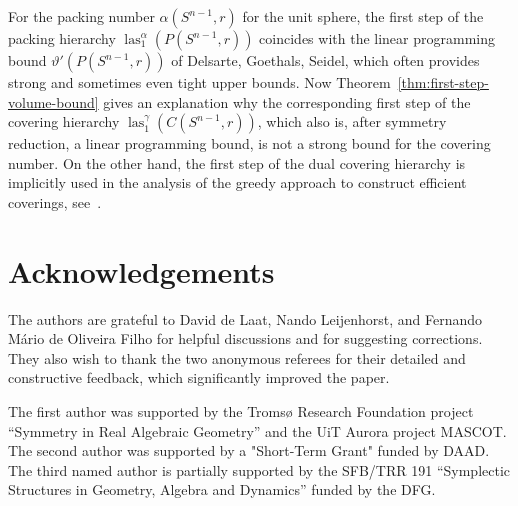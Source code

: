 \documentclass{amsart}
\DeclareMathOperator{\las}{las}
\begin{document}
For the packing number $\alpha(S^{n-1}, r)$ for the unit sphere, the
first step of the packing hierarchy $\las^{\alpha}_1(P(S^{n-1}, r))$
coincides with the linear programming bound $\vartheta'(P(S^{n-1},r))$
of Delsarte, Goethals, Seidel, which often provides strong and
sometimes even tight upper bounds. Now
Theorem~\ref{thm:first-step-volume-bound} gives an explanation why the
corresponding first step of the covering hierarchy
$\las^{\gamma}_1(C(S^{n-1}, r))$, which also is, after symmetry
reduction, a linear programming bound, is not a strong bound for the
covering number. On the other hand, the first step of the dual
covering hierarchy is implicitly used in the analysis of the greedy
approach to construct efficient coverings,
see~\cite{Rolfes-Vallentin-2018}.

%
%
%

\section*{Acknowledgements}

The authors are grateful to David de Laat, Nando Leijenhorst, and Fernando M\'ario de Oliveira Filho for helpful discussions and for suggesting corrections. They also wish to thank the two anonymous referees for their detailed and constructive feedback, which significantly improved the paper.

The first author was supported by the Troms{\o} Research Foundation project ``Symmetry in Real Algebraic Geometry'' and the UiT Aurora project MASCOT. The second author was supported by a "Short-Term Grant" funded by DAAD. The third named author is partially supported by the SFB/TRR 191
``Symplectic Structures in Geometry, Algebra and Dynamics'' funded by
the DFG.

%
%
%
\end{document}
